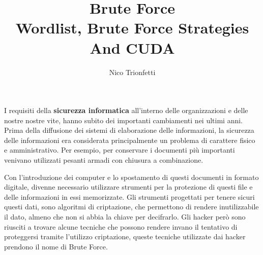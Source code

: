 \documentclass[a4paper]{unicam_thesis}
\title{Brute Force \\ Wordlist, Brute Force Strategies And CUDA }
\author{Nico Trionfetti}%
\theoremstyle{definition} \newtheorem{esempio}{Esempio}[chapter]
\theoremstyle{definition}
\begin{document}
\maketitle


\tableofcontents

\abstract

I requisiti della \textbf{sicurezza informatica} all'interno delle organizzazioni e delle nostre nostre vite, hanno subito dei importanti cambiamenti nei ultimi anni. Prima della diffusione dei sistemi di elaborazione delle informazioni, la sicurezza delle informazioni era considerata principalmente un problema di carattere fisico e amministrativo. Per esempio, per conservare i documenti più importanti venivano utilizzati pesanti armadi con chiusura a combinazione.

Con l'introduzione dei computer e lo spostamento di questi documenti in formato digitale, divenne necessario utilizzare strumenti per la protezione di questi file e delle informazioni in essi memorizzate. Gli strumenti progettati per tenere sicuri questi dati, sono algoritmi di criptazione, che permettono di rendere inutilizzabile il dato, almeno che non si abbia la chiave per decifrarlo. Gli hacker però sono riusciti a trovare alcune tecniche che possono rendere invano il tentativo di proteggersi tramite l'utilizzo criptazione, queste tecniche utilizzate dai hacker prendono il nome di Brute Force. 











\lstlistoflistings
\listoffigures
\listoftables

\appendix
%
%
%

\printbibliography

\printindex


\end{document}
